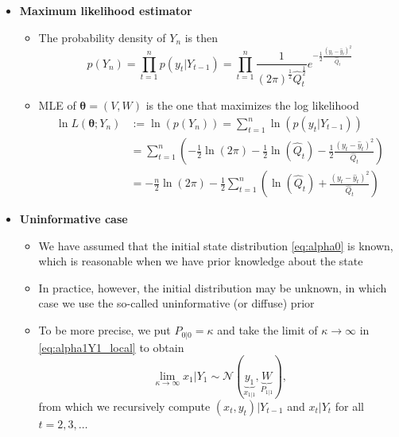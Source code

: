 \documentclass[12pt,a4paper]{article}
\begin{document}
\begin{itemize}

\item \textbf{Maximum likelihood estimator}

  \begin{itemize}

  \item The probability density of $Y_{n}$ is then
    \begin{equation}\label{eq:pyn_local}%
      p(Y_{n})
      = \prod_{t=1}^{n}p(y_{t}|Y_{t-1})
      = \prod_{t=1}^{n}\frac{1}{(2\pi)^{\frac{1}{2}}\hat{Q}_{t}^{\frac{1}{2}}}e^{- \frac{1}{2}\frac{(y_{t}-\hat{y}_{t})^{2}}{\hat{Q}_{t}}}
    \end{equation}

  \item MLE of $\bm{\theta}=(V,W)$ is the one that maximizes the log
    likelihood
    \begin{align}
      \ln L(\bm{\theta};Y_{n})
      & := \ln \left(p(Y_{n})\right)
        = \sum_{t=1}^{n}\ln \left(p(y_{t}|Y_{t-1})\right) \nonumber \\
      & = \sum_{t=1}^{n}\left(- \frac{1}{2}\ln(2\pi) - \frac{1}{2}\ln(\hat{Q}_{t}) - \frac{1}{2}\frac{(y_{t}-\hat{y}_{t})^{2}}{\hat{Q}_{t}}\right) \nonumber \\
      & = - \frac{n}{2}\ln(2\pi) - \frac{1}{2}\sum_{t=1}^{n}\left(\ln(\hat{Q}_{t}) + \frac{(y_{t}-\hat{y}_{t})^{2}}{\hat{Q}_{t}}\right)
        \label{eq:logL_local}%
    \end{align}

  \end{itemize}

\item \textbf{Uninformative case}

  \begin{itemize}

  \item We have assumed that the initial state distribution
    \eqref{eq:alpha0} is known, which is reasonable when we have prior
    knowledge about the state

  \item In practice, however, the initial distribution may be unknown,
    in which case we use the so-called uninformative (or diffuse)
    prior %

  \item To be more precise, we put $P_{{0|0}}=\kappa$ and take the
    limit of $\kappa\to \infty$ in \eqref{eq:alpha1Y1_local} to obtain
    \begin{equation}\label{eq:alpha1Y1_diffuse_local}%
      \lim_{\kappa\to\infty}x_{1}|Y_{1}
      \sim \mathcal{N} (\underbrace{y_{1}}_{x_{1|1}}, \underbrace{W}_{P_{1|1}}),
    \end{equation}
    from which we recursively compute $(x_{t},y_{t})|Y_{t-1}$ and
    $x_{t}|Y_{t}$ for all $t = 2, 3,\ldots$


\end{itemize}
\end{itemize}
\end{document}
